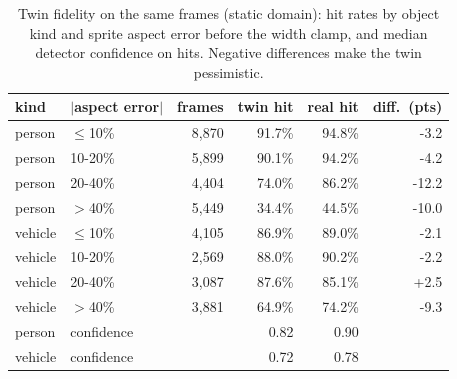 \begin{table}[t]
\centering
\caption{Twin fidelity on the same frames (static domain): hit rates by object kind and sprite aspect error before the width clamp, and median detector confidence on hits. Negative differences make the twin pessimistic.}
\label{tab:fidelity}
\scriptsize
\setlength{\tabcolsep}{3pt}
\begin{tabular}{@{}llrrrr@{}}
\toprule
kind & $|$aspect error$|$ & frames & twin hit & real hit & diff.\ (pts) \\
\midrule
person & $\le$10\% & 8,870 & 91.7\% & 94.8\% & -3.2 \\
person & 10-20\% & 5,899 & 90.1\% & 94.2\% & -4.2 \\
person & 20-40\% & 4,404 & 74.0\% & 86.2\% & -12.2 \\
person & $>$40\% & 5,449 & 34.4\% & 44.5\% & -10.0 \\
vehicle & $\le$10\% & 4,105 & 86.9\% & 89.0\% & -2.1 \\
vehicle & 10-20\% & 2,569 & 88.0\% & 90.2\% & -2.2 \\
vehicle & 20-40\% & 3,087 & 87.6\% & 85.1\% & +2.5 \\
vehicle & $>$40\% & 3,881 & 64.9\% & 74.2\% & -9.3 \\
\midrule
person & confidence & & 0.82 & 0.90 & \\
vehicle & confidence & & 0.72 & 0.78 & \\
\bottomrule
\end{tabular}
\end{table}
